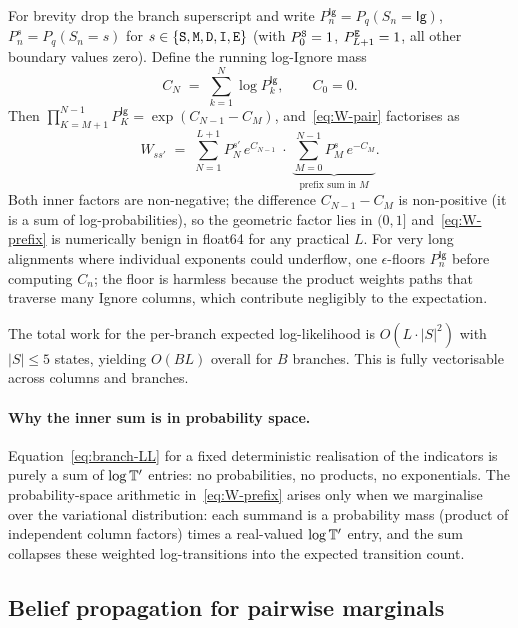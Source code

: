 For brevity drop the branch superscript and write
$P_n^{\mathsf{Ig}} = P_q(S_n = \mathsf{Ig})$,
$P_n^{s} = P_q(S_n = s)$ for $s \in \{{\tt S}, {\tt M}, {\tt D}, {\tt I}, {\tt E}\}$
(with $P_0^{{\tt S}} = 1$, $P_{L+1}^{{\tt E}} = 1$, all other boundary
values zero).
Define the running log-Ignore mass
\begin{equation}
\label{eq:cumulant}
C_N \;=\; \sum_{k=1}^{N} \log P_k^{\mathsf{Ig}},
\qquad C_0 = 0.
\end{equation}
Then $\prod_{K=M+1}^{N-1} P_K^{\mathsf{Ig}} = \exp(C_{N-1} - C_M)$,
and~\eqref{eq:W-pair} factorises as
\begin{equation}
\label{eq:W-prefix}
W_{s s'}
\;=\;
\sum_{N=1}^{L+1}
P_N^{s'}\,e^{C_{N-1}}
\;\cdot\;
\underbrace{\sum_{M=0}^{N-1} P_M^{s}\,e^{-C_M}}_{\text{prefix sum in }M}.
\end{equation}
Both inner factors are non-negative; the difference $C_{N-1} - C_M$
is non-positive (it is a sum of log-probabilities), so the geometric
factor lies in $(0, 1]$ and~\eqref{eq:W-prefix} is numerically benign
in float64 for any practical $L$.
For very long alignments where individual exponents could underflow,
one $\epsilon$-floors $P_n^{\mathsf{Ig}}$ before computing $C_n$;
the floor is harmless because the product weights paths that traverse
many Ignore columns, which contribute negligibly to the expectation.

The total work for the per-branch expected log-likelihood
is $O(L \cdot |S|^2)$ with $|S| \le 5$ states,
yielding $O(B L)$ overall for $B$ branches.
This is fully vectorisable across columns and branches.

\paragraph{Why the inner sum is in probability space.}
Equation~\eqref{eq:branch-LL} for a fixed deterministic realisation
of the indicators is purely a sum of $\log \mathbb{T}'$ entries:
no probabilities, no products, no exponentials.
The probability-space arithmetic in~\eqref{eq:W-prefix} arises only
when we marginalise over the variational distribution: each summand
is a probability mass (product of independent column factors) times a
real-valued $\log \mathbb{T}'$ entry, and the sum collapses these
weighted log-transitions into the expected transition count.

\subsection{Belief propagation for pairwise marginals}
\label{sec:varanc-presence-bp}

